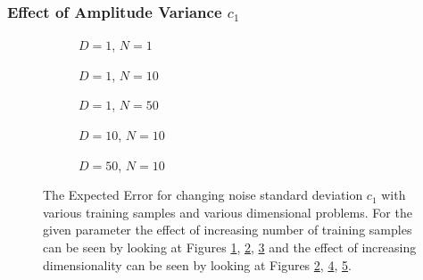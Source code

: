 \subsubsection{Effect of Amplitude Variance $c_1$}
\begin{figure}[!h]
  \centering
    \begin{subfigure}{0.3\textwidth}
      \centering
      \caption{$D=1$, $N=1$}
      \label{fig:nonlinear-c1-N-1-D-1}
    \end{subfigure}
    \begin{subfigure}{0.3\textwidth}
      \centering
      \caption{$D=1$, $N=10$}
      \label{fig:nonlinear-c1-N-10-D-1}
    \end{subfigure}
    \begin{subfigure}{0.3\textwidth}
      \centering
      \caption{$D=1$, $N=50$}
      \label{fig:nonlinear-c1-N-50-D-1}
    \end{subfigure}

    \begin{subfigure}{0.3\textwidth}
      \centering
      \caption{$D=10$, $N=10$}
      \label{fig:nonlinear-c1-N-10-D-10}
    \end{subfigure}
    \begin{subfigure}{0.3\textwidth}
      \centering
      \caption{$D=50$, $N=10$}
      \label{fig:nonlinear-c1-N-10-D-50}
    \end{subfigure}  

  \caption{The Expected Error for changing noise standard deviation $c_1$ with various training samples and various dimensional problems. For the given parameter the effect of increasing number of training samples can be seen by looking at Figures \ref{fig:nonlinear-c1-N-1-D-1}, \ref{fig:nonlinear-c1-N-10-D-1}, \ref{fig:nonlinear-c1-N-50-D-1} and the effect of increasing dimensionality can be seen by looking at Figures \ref{fig:nonlinear-c1-N-10-D-1}, \ref{fig:nonlinear-c1-N-10-D-10}, \ref{fig:nonlinear-c1-N-10-D-50}.}\label{fig:nonlinear-c1}
\end{figure}
